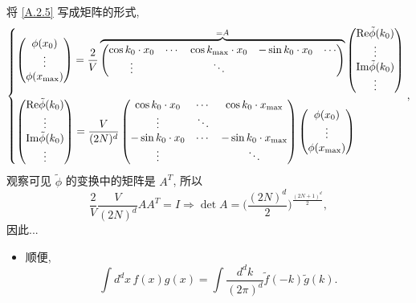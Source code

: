 \begin{itemize}
\begin{tcolorbox}[title=proof:]
		将 \eqref{A.2.5} 写成矩阵的形式,
		\begin{equation}
			\begin{dcases}
				\begin{pmatrix}
					\phi(x_0) \\
					\vdots \\
					\phi(x_{\max})
				\end{pmatrix} = \frac{2}{V} \overbrace{\begin{pmatrix}
					\cos k_0 \cdot x_0 & \cdots & \cos k_{\max} \cdot x_0 & - \sin k_0 \cdot x_0 & \cdots \\
					\vdots & & \ddots & &
				\end{pmatrix}}^{= A} \begin{pmatrix}
					\mathrm{Re} \tilde{\phi}(k_0) \\
					\vdots \\
					\mathrm{Im} \tilde{\phi}(k_0) \\
					\vdots
				\end{pmatrix} \\
				\begin{pmatrix}
					\mathrm{Re} \tilde{\phi}(k_0) \\
					\vdots \\
					\mathrm{Im} \tilde{\phi}(k_0) \\
					\vdots
				\end{pmatrix} = \frac{V}{(2 N)^d} \begin{pmatrix}
					\cos k_0 \cdot x_0 & \cdots & \cos k_0 \cdot x_{\max} \\
					\vdots & \ddots & \\
					- \sin k_0 \cdot x_0 & \cdots & - \sin k_0 \cdot x_{\max} \\
					\vdots & & \ddots
				\end{pmatrix} \begin{pmatrix}
					\phi(x_0) \\
					\vdots \\
					\phi(x_{\max})
				\end{pmatrix}
			\end{dcases},
		\end{equation}
		观察可见 $\tilde{\phi}$ 的变换中的矩阵是 $A^T$, 所以
		\begin{equation}
			\frac{2}{V} \frac{V}{(2 N)^d} A A^T = I \Longrightarrow \det A = \Big( \frac{(2 N)^d}{2} \Big)^{\frac{(2 N + 1)^d}{2}},
		\end{equation}
		因此...
	\end{tcolorbox}
	
	\begin{itemize}
		\item 顺便,
		\begin{equation}
			\int d^d x \, f(x) g(x) = \int \frac{d^d k}{(2 \pi)^d} \tilde{f}(- k) \tilde{g}(k).
		\end{equation}
	\end{itemize}
\end{itemize}

